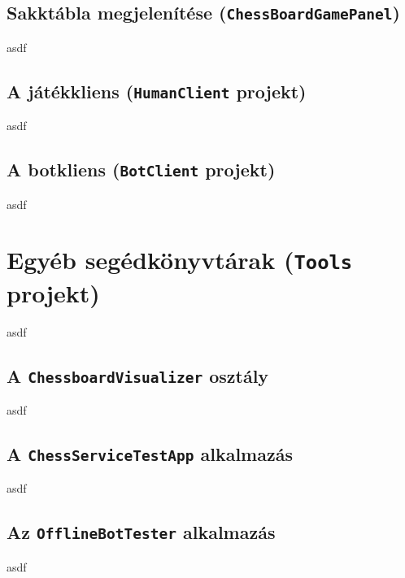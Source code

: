 \documentclass[twoside, a4paper, 12pt]{book}
\begin{document}
\subsection{Sakktábla megjelenítése (\texttt{ChessBoardGamePanel})}
asdf
\subsection{A játékkliens (\texttt{HumanClient} projekt)}
asdf
\subsection{A botkliens (\texttt{BotClient} projekt)}
asdf

\section{Egyéb segédkönyvtárak (\texttt{Tools} projekt)}
asdf
\subsection{A \texttt{ChessboardVisualizer} osztály}
asdf
\subsection{A \texttt{ChessServiceTestApp} alkalmazás}
asdf
\subsection{Az \texttt{OfflineBotTester} alkalmazás}
asdf

\newpage
\end{document}
